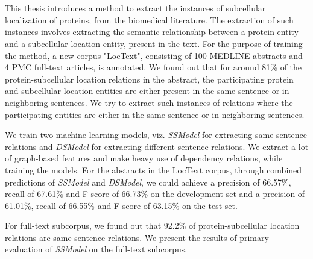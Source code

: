 \chapter{\abstractname}


This thesis introduces a method to extract the instances of subcellular localization of proteins, from the biomedical literature. The extraction of such instances involves extracting the semantic relationship between a protein entity and a subcellular location entity, present in the text. For the purpose of training the method, a new corpus "LocText", consisting of 100 MEDLINE abstracts and 4 PMC full-text articles, is annotated. We found out that for around 81\% of the protein-subcellular location relations in the abstract, the participating protein and subcellular location entities are either present in the same sentence or in neighboring sentences. We try to extract such instances of relations where the participating entities are either in the same sentence or in neighboring sentences.

We train two machine learning models, viz. \textit{SSModel} for extracting same-sentence relations and \textit{DSModel} for extracting different-sentence relations. We extract a lot of graph-based features and make heavy use of dependency relations, while training the models. For the abstracts in the LocText corpus, through combined predictions of \textit{SSModel} and \textit{DSModel}, we could achieve a precision of 66.57\%, recall of 67.61\% and F-score of 66.73\% on the development set and a precision of 61.01\%, recall of 66.55\% and F-score of 63.15\% on the test set.

For full-text subcorpus, we found out that 92.2\% of protein-subcellular location relations are same-sentence relations. We present the results of primary evaluation of \textit{SSModel} on the full-text subcorpus.